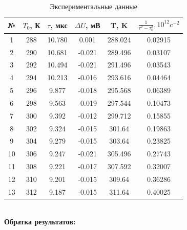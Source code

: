 \documentclass[a4paper,12pt]{article}
\begin{document}
\begin{table}[h!]
	\centering
	\caption{ Экспериментальные данные }

\begin{tabular}{|c|c|c|c|c|c|}
	\hline 
	\rule[0ex]{0pt}{2.5ex} № & $T_0$, К & $\tau$, мкс & $\Delta U$, мВ & T, K & $\frac{1}{\tau^2-\tau_0 ^2}, 10^{12} c^{-2}$ \\
	\hline 
	1 & 288 & 10.780 & 0.001 & 288.024 & 0.02915 \\
	\hline 
	2 & 290 & 10.681 & -0.021 & 289.496 & 0.03107 \\ 
	\hline 
	3 & 292 & 10.494 & -0.021 & 291.496 & 0.03543 \\ 
	\hline 
	4 & 294 & 10.213 & -0.016 & 293.616 & 0.04464 \\ 
	\hline 
	5 & 296 & 9.877 & -0.018 & 295.568 & 0.06389 \\
	\hline 
	6 & 298 & 9.563 & -0.019 & 297.544 & 0.10473 \\
	\hline 
	7 & 300 & 9.392 & -0.012 & 299.712 & 0.15855 \\
	\hline 
	8 & 302 & 9.324 & -0.015 & 301.64 & 0.19863 \\
	\hline 
	9 & 304 & 9.279 & -0.015 & 303.64 & 0.23825 \\
	\hline 
	10 & 306 & 9.247 & -0.021 & 305.496 & 0.27743 \\ 
	\hline 
	11 & 308 & 9.221 & -0.017 & 307.592 & 0.32007 \\
	\hline 
	12 & 310 & 9.201 & -0.015 & 309.64 & 0.36286 \\
	\hline 
	13 & 312 & 9.187 & -0.015 & 311.64 & 0.40025 \\
	\hline 
\end{tabular} 
\end{table}
	\\
	\hspace{0.2cm}\textbf{Обратка результатов:}
\end{document}
